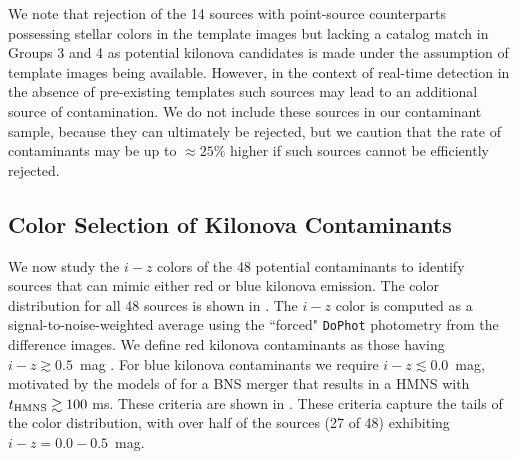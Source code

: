 We note that rejection of the 14 sources with point-source counterparts possessing stellar colors in the template images but lacking a catalog match in Groups 3 and 4 as potential kilonova candidates is made under the assumption of template images being available. However, in the context of real-time detection in the absence of pre-existing templates such sources may lead to an additional source of contamination. We do not include these sources in our contaminant sample, because they can ultimately be rejected, but we caution that the rate of contaminants may be up to $\approx 25\%$ higher if such sources cannot be efficiently rejected.

\subsection{Color Selection of Kilonova Contaminants}
\label{sec:ch3_kn_search}
We now study the $i-z$ colors of the 48 potential contaminants to identify sources that can mimic either red or blue kilonova emission. The color distribution for all 48 sources is shown in . The $i-z$ color is computed as a signal-to-noise-weighted average using the ``forced" {\tt DoPhot} photometry from the difference images. We define red kilonova contaminants as those having $i-z \gtrsim 0.5$~mag \citep{BarnesKasen13,CowpBerger15}. For blue kilonova contaminants we require $i-z \lesssim 0.0$~mag, motivated by the models of \cite{Kasen+15} for a BNS merger that results in a HMNS with $t_{\rm HMNS}\gtrsim 100$ ms. These criteria are shown in . These criteria capture the tails of the color distribution, with over half of the sources (27 of 48) exhibiting $i-z = 0.0-0.5$~mag.


